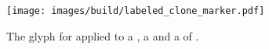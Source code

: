 \begin{figure}[H]
  \centering
  \texttt{[image: images/build/labeled\_clone\_marker.pdf]}
  \caption{The \PD glyph for  applied to a , a  and a  of .}
  \label{fig:labelledCloneMarker}
\end{figure}
